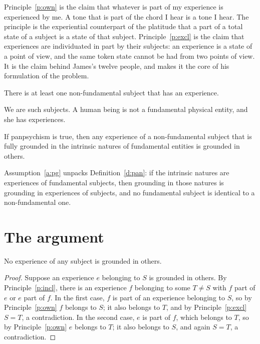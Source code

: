 \documentclass{situationist-preprint}
\begin{document}
Principle~\ref{p:own} is the claim that whatever is part of my experience is experienced by me. A tone that is part of the chord I hear is a tone I hear. The principle is the experiential counterpart of the platitude that a part of a total state of a subject is a state of that subject. Principle~\ref{p:excl} is the claim that experiences are individuated in part by their subjects: an experience is a state of a point of view, and the same token state cannot be had from two points of view. It is the claim behind James's twelve people, and \citet{Coleman2014} makes it the core of his formulation of the problem.

\begin{assumption}\label{a:macro}
There is at least one non-fundamental subject that has an experience.
\end{assumption}

We are such subjects. A human being is not a fundamental physical entity, and she has experiences.

\begin{assumption}\label{a:pg}
If panpsychism is true, then any experience of a non-fundamental subject that is fully grounded in the intrinsic natures of fundamental entities is grounded in others.
\end{assumption}

Assumption~\ref{a:pg} unpacks Definition~\ref{d:pan}: if the intrinsic natures are experiences of fundamental subjects, then grounding in those natures is grounding in experiences of subjects, and no fundamental subject is identical to a non-fundamental one.

\section{The argument}\label{s:arg}

\begin{lemma}\label{l:nosum}
No experience of any subject is grounded in others.
\end{lemma}

\begin{proof}
Suppose an experience $e$ belonging to $S$ is grounded in others. By Principle~\ref{p:incl}, there is an experience $f$ belonging to some $T \neq S$ with $f$ part of $e$ or $e$ part of $f$. In the first case, $f$ is part of an experience belonging to $S$, so by Principle~\ref{p:own} $f$ belongs to $S$; it also belongs to $T$, and by Principle~\ref{p:excl} $S = T$, a contradiction. In the second case, $e$ is part of $f$, which belongs to $T$, so by Principle~\ref{p:own} $e$ belongs to $T$; it also belongs to $S$, and again $S = T$, a contradiction.
\end{proof}
\end{document}
